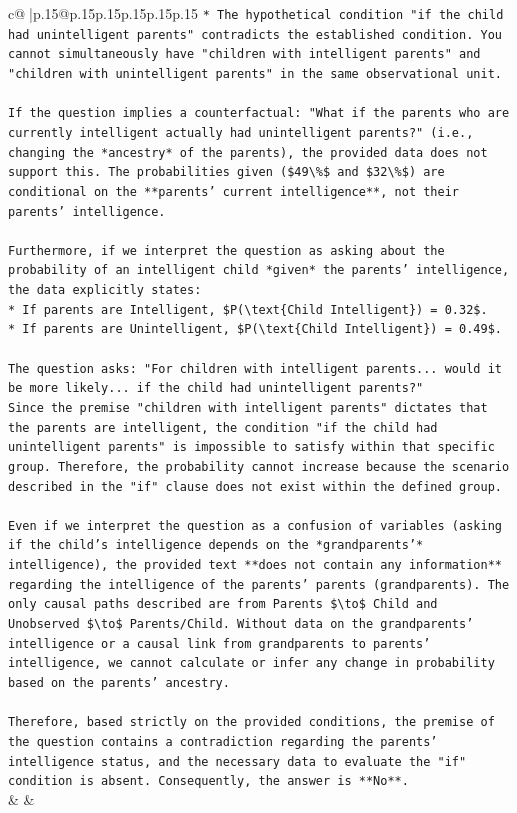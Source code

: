 \documentclass{article}
\begin{document}
{\begin{supertabular}{c@{$\;$}|p{.15\linewidth}@{}p{.15\linewidth}p{.15\linewidth}p{.15\linewidth}p{.15\linewidth}p{.15\linewidth}}
{{{\texttt{*   The hypothetical condition "if the child had unintelligent parents" contradicts the established condition. You cannot simultaneously have "children with intelligent parents" and "children with unintelligent parents" in the same observational unit.} \\
\\ 
\texttt{If the question implies a counterfactual: "What if the parents who are currently intelligent actually had unintelligent parents?" (i.e., changing the *ancestry* of the parents), the provided data does not support this. The probabilities given (\$49\textbackslash{}\%\$ and \$32\textbackslash{}\%\$) are conditional on the **parents' current intelligence**, not their parents' intelligence.} \\
\\ 
\texttt{Furthermore, if we interpret the question as asking about the probability of an intelligent child *given* the parents' intelligence, the data explicitly states:} \\
\texttt{*   If parents are Intelligent, \$P(\textbackslash{}text\{Child Intelligent\}) = 0.32\$.} \\
\texttt{*   If parents are Unintelligent, \$P(\textbackslash{}text\{Child Intelligent\}) = 0.49\$.} \\
\\ 
\texttt{The question asks: "For children with intelligent parents... would it be more likely... if the child had unintelligent parents?"} \\
\texttt{Since the premise "children with intelligent parents" dictates that the parents are intelligent, the condition "if the child had unintelligent parents" is impossible to satisfy within that specific group. Therefore, the probability cannot increase because the scenario described in the "if" clause does not exist within the defined group.} \\
\\ 
\texttt{Even if we interpret the question as a confusion of variables (asking if the child's intelligence depends on the *grandparents'* intelligence), the provided text **does not contain any information** regarding the intelligence of the parents' parents (grandparents). The only causal paths described are from Parents \$\textbackslash{}to\$ Child and Unobserved \$\textbackslash{}to\$ Parents/Child. Without data on the grandparents' intelligence or a causal link from grandparents to parents' intelligence, we cannot calculate or infer any change in probability based on the parents' ancestry.} \\
\\ 
\texttt{Therefore, based strictly on the provided conditions, the premise of the question contains a contradiction regarding the parents' intelligence status, and the necessary data to evaluate the "if" condition is absent. Consequently, the answer is **No**.} \\
            }
        }
    }
    & & \\ \\


\end{supertabular}}
\end{document}
